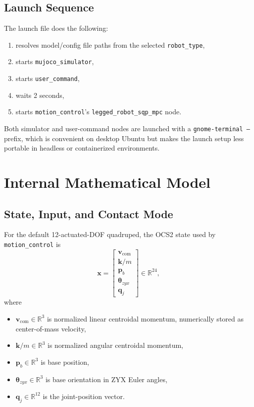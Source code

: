 \documentclass[11pt,a4paper]{article}
\newcommand{\R}{\mathbb{R}}
\newcommand{\vect}[1]{\bm{#1}}
\newcommand{\code}[1]{\texttt{#1}}
\begin{document}
\subsection{Launch Sequence}
The launch file does the following:
\begin{enumerate}[leftmargin=*]
\item resolves model/config file paths from the selected \code{robot\_type},
\item starts \code{mujoco\_simulator},
\item starts \code{user\_command},
\item waits 2 seconds,
\item starts \code{motion\_control}'s \code{legged\_robot\_sqp\_mpc} node.
\end{enumerate}
Both simulator and user-command nodes are launched with a \code{gnome-terminal --} prefix, which is convenient on desktop Ubuntu but makes the launch setup less portable in headless or containerized environments.

\section{Internal Mathematical Model}
\subsection{State, Input, and Contact Mode}
For the default 12-actuated-DOF quadruped, the OCS2 state used by \code{motion\_control} is
\begin{equation}
\vect{x} =
\begin{bmatrix}
\vect{v}_{\mathrm{com}} \\
\vect{k}/m \\
\vect{p}_b \\
\vect{\theta}_{zyx} \\
\vect{q}_j
\end{bmatrix}
\in \R^{24},
\end{equation}
where
\begin{itemize}[leftmargin=*]
\item $\vect{v}_{\mathrm{com}} \in \R^3$ is normalized linear centroidal momentum, numerically stored as center-of-mass velocity,
\item $\vect{k}/m \in \R^3$ is normalized angular centroidal momentum,
\item $\vect{p}_b \in \R^3$ is base position,
\item $\vect{\theta}_{zyx} \in \R^3$ is base orientation in ZYX Euler angles,
\item $\vect{q}_j \in \R^{12}$ is the joint-position vector.
\end{itemize}
\end{document}
